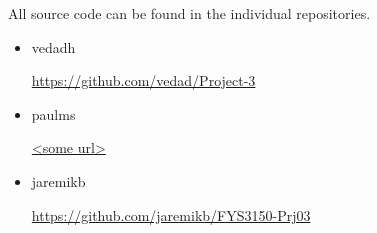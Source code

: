 All source code can be found in the individual repositories.

\begin{itemize}
    \item vedadh

        \url{https://github.com/vedad/Project-3}
    \item paulms

        \url{<some url>}
    \item jaremikb

        \url{https://github.com/jaremikb/FYS3150-Prj03}
\end{itemize}
